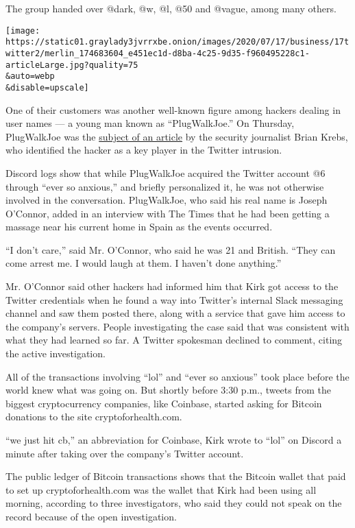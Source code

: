 The group handed over @dark, @w, @l, @50 and @vague, among many others.

\texttt{[image: https://static01.graylady3jvrrxbe.onion/images/2020/07/17/business/17twitter2/merlin\_174683604\_e451ec1d-d8ba-4c25-9d35-f960495228c1-articleLarge.jpg?quality=75\\\&auto=webp\\\&disable=upscale]}

One of their customers was another well-known figure among hackers
dealing in user names --- a young man known as ``PlugWalkJoe.'' On
Thursday, PlugWalkJoe was the
\href{https://krebsonsecurity.com/2020/07/whos-behind-wednesdays-epic-twitter-hack/}{subject
of an article} by the security journalist Brian Krebs, who identified
the hacker as a key player in the Twitter intrusion.

Discord logs show that while PlugWalkJoe acquired the Twitter account @6
through ``ever so anxious,'' and briefly personalized it, he was not
otherwise involved in the conversation. PlugWalkJoe, who said his real
name is Joseph O'Connor, added in an interview with The Times that he
had been getting a massage near his current home in Spain as the events
occurred.

``I don't care,'' said Mr. O'Connor, who said he was 21 and British.
``They can come arrest me. I would laugh at them. I haven't done
anything.''

Mr. O'Connor said other hackers had informed him that Kirk got access to
the Twitter credentials when he found a way into Twitter's internal
Slack messaging channel and saw them posted there, along with a service
that gave him access to the company's servers. People investigating the
case said that was consistent with what they had learned so far. A
Twitter spokesman declined to comment, citing the active investigation.

All of the transactions involving ``lol'' and ``ever so anxious'' took
place before the world knew what was going on. But shortly before 3:30
p.m., tweets from the biggest cryptocurrency companies, like Coinbase,
started asking for Bitcoin donations to the site cryptoforhealth.com.

``we just hit cb,'' an abbreviation for Coinbase, Kirk wrote to ``lol''
on Discord a minute after taking over the company's Twitter account.

The public ledger of Bitcoin transactions shows that the Bitcoin wallet
that paid to set up cryptoforhealth.com was the wallet that Kirk had
been using all morning, according to three investigators, who said they
could not speak on the record because of the open investigation.

